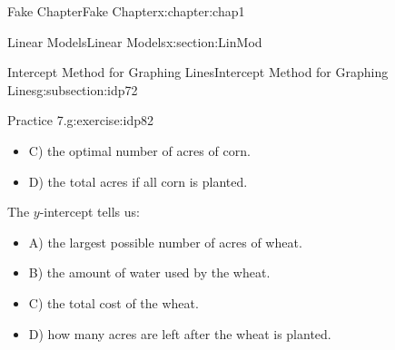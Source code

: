 \documentclass[oneside,10pt,]{book}
\numberwithin{equation}{section}
\begin{document}
\begin{chapterptx}{Fake Chapter}{}{Fake Chapter}{}{}{x:chapter:chap1}
\begin{sectionptx}{Linear Models}{}{Linear Models}{}{}{x:section:LinMod}
\begin{subsectionptx}{Intercept Method for Graphing Lines}{}{Intercept Method for Graphing Lines}{}{}{g:subsection:idp72}
\begin{inlineexercise}{Practice 7.}{g:exercise:idp82}
\begin{enumerate}[label=\alph*.]
\begin{itemize}[label=$\odot$,leftmargin=3em,]
\item{}C) the optimal number of acres of corn.%

\item{}D) the total acres if all corn is planted.%

\end{itemize}
%
\par
The \(y\)-intercept tells us:%
\par
\begin{itemize}[label=$\odot$,leftmargin=3em,]
\item{}A) the largest possible number of acres of wheat.%

\item{}B) the amount of water used by the wheat.%

\item{}C) the total cost of the wheat.%

\item{}D) how many acres are left after the wheat is planted.%


\end{itemize}
\end{enumerate}
\end{inlineexercise}
\end{subsectionptx}
\end{sectionptx}
\end{chapterptx}
\end{document}
